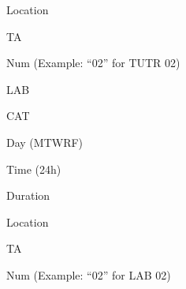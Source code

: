 \begin{itemize*}
\begin{itemize*}
\begin{itemize*}
\begin{itemize*}
				\item Location
				\item TA
				\item Num (Example: ``02'' for TUTR 02)
			\end{itemize*}
			\item LAB
			\begin{itemize*}
				\item CAT
				\item Day (MTWRF)
				\item Time (24h)
				\item Duration
				\item Location
				\item TA
				\item Num (Example: ``02'' for LAB 02)
			\end{itemize*}
		\end{itemize*}
	\end{itemize*}
\end{itemize*}


